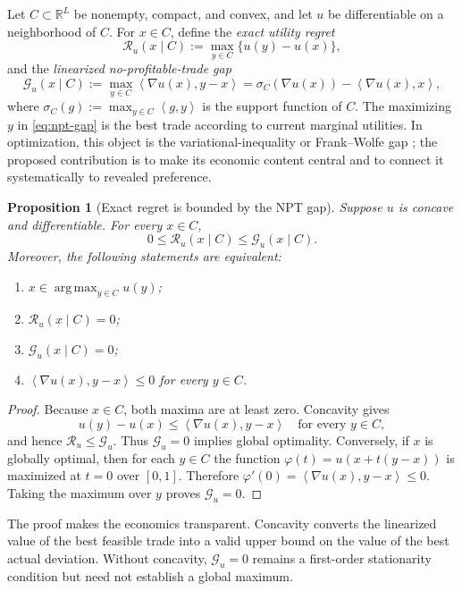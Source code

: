 \documentclass[11pt]{article}
\newcommand{\R}{\mathbb{R}}
\newcommand{\cG}{\mathcal{G}}
\newcommand{\cR}{\mathcal{R}}
\newcommand{\ip}[2]{\left\langle #1,#2\right\rangle}
\newcommand{\argmax}{\operatorname*{arg\,max}}
\newtheorem{proposition}[theorem]{Proposition}
\theoremstyle{definition}
\theoremstyle{remark}
\begin{document}
Let $C\subset\R^L$ be nonempty, compact, and convex, and let $u$ be differentiable on a
neighborhood of $C$.  For $x\in C$, define the \emph{exact utility regret}
\begin{equation}
  \cR_u(x\mid C)
  :=\max_{y\in C}\{u(y)-u(x)\},
  \label{eq:exact-regret}
\end{equation}
and the \emph{linearized no-profitable-trade gap}
\begin{equation}
  \cG_u(x\mid C)
  :=\max_{y\in C}\ip{\nabla u(x)}{y-x}
  =\sigma_C(\nabla u(x))-\ip{\nabla u(x)}{x},
  \label{eq:npt-gap}
\end{equation}
where $\sigma_C(g):=\max_{y\in C}\ip{g}{y}$ is the support function of $C$.
The maximizing $y$ in \eqref{eq:npt-gap} is the best trade according to current marginal
utilities.  In optimization, this object is the variational-inequality or Frank--Wolfe gap
\cite{FrankWolfe1956,Jaggi2013}; the proposed contribution is to make its economic content
central and to connect it systematically to revealed preference.

\begin{proposition}[Exact regret is bounded by the NPT gap]
\label{prop:regret-gap}
Suppose $u$ is concave and differentiable.  For every $x\in C$,
\[
  0\le \cR_u(x\mid C)\le \cG_u(x\mid C).
\]
Moreover, the following statements are equivalent:
\begin{enumerate}[label=(\roman*)]
  \item $x\in\argmax_{y\in C}u(y)$;
  \item $\cR_u(x\mid C)=0$;
  \item $\cG_u(x\mid C)=0$;
  \item $\ip{\nabla u(x)}{y-x}\le0$ for every $y\in C$.
\end{enumerate}
\end{proposition}

\begin{proof}
Because $x\in C$, both maxima are at least zero.  Concavity gives
\[
  u(y)-u(x)\le\ip{\nabla u(x)}{y-x}
  \quad\text{for every }y\in C,
\]
and hence $\cR_u\le\cG_u$.  Thus $\cG_u=0$ implies global optimality.  Conversely,
if $x$ is globally optimal, then for each $y\in C$ the function
$\varphi(t)=u(x+t(y-x))$ is maximized at $t=0$ over $[0,1]$.  Therefore
$\varphi'(0)=\ip{\nabla u(x)}{y-x}\le0$.  Taking the maximum over $y$ proves
$\cG_u=0$.
\end{proof}

The proof makes the economics transparent.  Concavity converts the linearized value of the
best feasible trade into a valid upper bound on the value of the best actual deviation.  Without
concavity, $\cG_u=0$ remains a first-order stationarity condition but need not establish a global
maximum.
\end{document}
